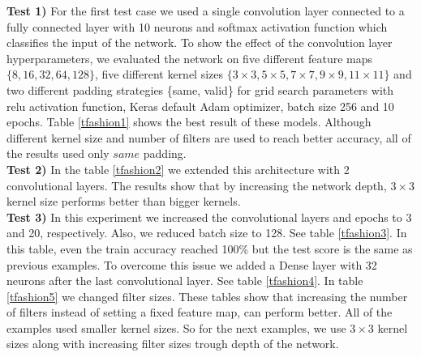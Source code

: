 \documentclass[10pt]{SelfArx} %
\begin{document}
	\textbf{Test 1)}  For the first test case we used a single convolution layer connected to a fully connected layer with 10 neurons and softmax activation function which classifies the input of the network. To show the effect of the convolution layer hyperparameters, we evaluated the network on five different feature maps $\{8,16,32,64,128\}$, five different kernel sizes $\{3\times3, 5\times5, 7\times7,9\times9,11\times11\}$ and two different padding strategies \{same, valid\} for grid search parameters with relu activation function, Keras default Adam optimizer, batch size 256 and 10 epochs. Table \ref{tfashion1} shows the best result of these models. Although different kernel size and number of filters are used to reach better accuracy, all of the results used only $same$ padding. 
	\\
	\textbf{Test 2)} In the table \ref{tfashion2} we extended this architecture with 2 convolutional layers. The results show that by increasing the network depth, $3\times3$ kernel size performs better than bigger kernels.
	\\
	\textbf{Test 3)} In this experiment we increased the convolutional layers and epochs to 3 and 20, respectively. Also, we reduced batch size to 128. See table \ref{tfashion3}. In this table, even the train accuracy reached 100\% but the test score is the same as previous examples. To overcome this issue we added a Dense layer with 32 neurons after the last convolutional layer. See table  \ref{tfashion4}. In table \ref{tfashion5} we changed filter sizes. These tables show that increasing the number of filters instead of setting a fixed feature map, can perform better. All of the examples used smaller kernel sizes. So for the next examples, we use $3\times3$ kernel sizes along with increasing filter sizes trough depth of the network.
	
\end{document}
